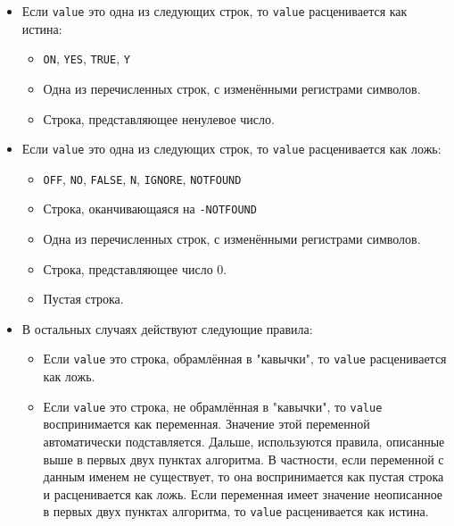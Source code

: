 \documentclass{article}
\begin{document}
\begin{itemize}
\item Если \texttt{value} это одна из следующих строк, то \texttt{value} расценивается как истина: 
\begin{itemize}
\item \texttt{ON}, \texttt{YES}, \texttt{TRUE}, \texttt{Y}
\item Одна из перечисленных строк, с изменёнными регистрами символов.
\item Строка, представляющее ненулевое число.
\end{itemize}

\item Если \texttt{value} это одна из следующих строк, то \texttt{value} расценивается как ложь:  
\begin{itemize}
\item \texttt{OFF}, \texttt{NO}, \texttt{FALSE}, \texttt{N}, \texttt{IGNORE}, \texttt{NOTFOUND}
\item Строка, оканчивающаяся на \texttt{-NOTFOUND}
\item Одна из перечисленных строк, с изменёнными регистрами символов.
\item Строка, представляющее число 0.
\item Пустая строка.
\end{itemize}


\item В остальных случаях действуют следующие правила:
\begin{itemize}
\item Если \texttt{value} это строка, обрамлённая в "кавычки"{}, то \texttt{value} расценивается как ложь.
\item Если \texttt{value} это строка, не обрамлённая в "кавычки"{}, то \texttt{value} воспринимается как переменная. Значение этой переменной автоматически подставляется. Дальше, используются правила, описанные выше в первых двух пунктах алгоритма. В частности, если переменной с данным именем не существует, то она воспринимается как пустая строка и расценивается как ложь. Если переменная имеет значение неописанное в первых двух пунктах алгоритма, то \texttt{value} расценивается как истина.
\end{itemize}


\end{itemize}
\end{document}
